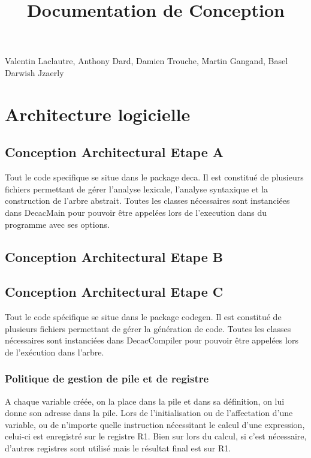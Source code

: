 \documentclass[12pt, a4paper, one side]{article}
\title{Documentation de Conception}
\author{}
\date{}
\begin{document}
    \maketitle

    \begin{center}
        Valentin Laclautre, Anthony Dard, Damien Trouche, Martin Gangand, Basel Darwish Jzaerly
    \end{center}

    \tableofcontents
    \section{Architecture logicielle}
    \subsection{Conception Architectural Etape A}
    Tout le code specifique se situe dans le package deca. Il est constitué de plusieurs fichiers
    permettant de gérer l'analyse lexicale, l'analyse syntaxique et la construction de l'arbre abstrait. Toutes les classes nécessaires sont instanciées dans DecacMain
    pour pouvoir être appelées lors de l'execution dans du programme avec ses options.
    \subsection{Conception Architectural Etape B}
    \subsection{Conception Architectural Etape C}

    Tout le code spécifique se situe dans le package codegen. Il est constitué de plusieurs fichiers
    permettant de gérer la génération de code. Toutes les classes nécessaires sont instanciées dans DecacCompiler
    pour pouvoir être appelées lors de l'exécution  dans l'arbre.

    \subsubsection{Politique de gestion de pile et de registre}

    A chaque variable créée, on la place dans la pile et dans sa définition, on lui donne son adresse dans la pile.
    Lors de l'initialisation ou de l'affectation d'une variable, ou de n'importe quelle instruction nécessitant le
    calcul d'une expression, celui-ci est enregistré sur le registre R1. Bien sur lors du calcul, si c'est nécessaire,
    d'autres registres sont utilisé mais le résultat final est sur R1.
\end{document}
